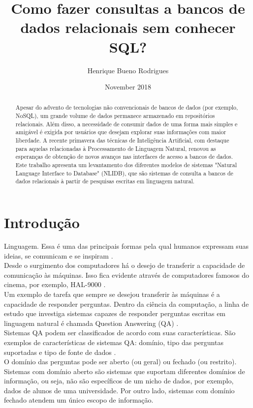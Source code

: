 \documentclass{article}
\title{Como fazer consultas a bancos de dados relacionais sem conhecer SQL?}
\author{Henrique Bueno Rodrigues}
\date{November 2018}
\begin{document}
\maketitle
\begin{abstract}
Apesar do advento de tecnologias não convencionais de bancos de dados (por exemplo, NoSQL), um grande volume de dados permanece armazenado em repositórios relacionais. Além disso, a necessidade de consumir dados de uma forma mais simples e amigável é exigida por usuários que desejam explorar suas informações com maior liberdade. A recente primavera das técnicas de Inteligência Artificial, com destaque para aquelas relacionadas à Processamento de Linguagem Natural, renovou as esperanças de obtenção de novos avanços nas interfaces de acesso a bancos de dados. Este trabalho apresenta um levantamento dos diferentes modelos de sistemas "Natural Language Interface to Database" (NLIDB), que são sistemas de consulta a bancos de dados relacionais à partir de pesquisas escritas em linguagem natural.

\end{abstract}

\section{Introdução}

Linguagem. Essa é uma das principais formas pela qual humanos expressam suas ideias, se comunicam e se inspiram \citep{harari2014sapiens}.\\

Desde o surgimento dos computadores há o desejo de transferir a capacidade de comunicação às máquinas. Isso fica evidente através de computadores famosos do cinema, por exemplo, HAL-9000 \citep{hal9000}.\\

Um exemplo de tarefa que sempre se desejou transferir às máquinas é a capacidade de responder perguntas. Dentro da ciência da computação, a linha de estudo que investiga sistemas capazes de responder perguntas escritas em linguagem natural é chamada Question Answering (QA) \citep{hirschman2001natural}.\\

Sistemas QA podem ser classificados de acordo com suas características. São exemplos de características de sistemas QA: domínio, tipo das perguntas suportadas e tipo de fonte de dados \citep{mishra2016survey, speech}.\\

O domínio das perguntas pode ser aberto (ou geral) ou fechado (ou restrito). Sistemas com domínio aberto são sistemas que suportam diferentes domínios de informação, ou seja, não são específicos de um nicho de dados, por exemplo, dados de alunos de uma universidade. Por outro lado, sistemas com domínio fechado atendem um único escopo de informação.\\
\end{document}
